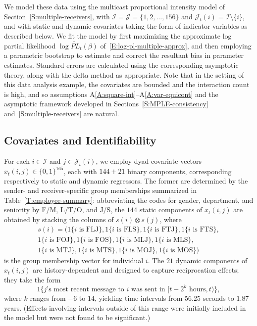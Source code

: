 \documentclass[final]{statsoc}
\begin{document}
We model these data using the multicast proportional intensity
model of Section~\ref{S:multiple-receivers}, with
$\mathcal{I} = \mathcal{J} = \{ 1, 2, \ldots, 156 \}$ and
$\mathcal{J}_t(i) = \mathcal{I} \setminus \{ i \}$, and with static and
dynamic covariates taking the form of indicator variables as described
below.  We fit the model by first maximizing the approximate log partial
likelihood $\log \widetilde{\mathit{PL}}_t(\beta)$ of~\eqref{E:log-pl-multiple-approx}, and then employing a
parametric bootstrap to estimate and correct the resultant bias in
parameter estimates.  Standard errors are calculated using the
corresponding asymptotic theory, along with the delta method as
appropriate.  Note that in the setting of this data analysis example,
the covariates are bounded and the interaction count is high, and so
assumptions A\ref{A:square-int}--A\ref{A:var-equicont} and the asymptotic
framework developed in Sections~\ref{S:MPLE-consistency}
and~\ref{S:multiple-receivers} are natural.

\subsection{Covariates and Identifiability}

For each $i \in \mathcal{I}$ and $j \in \mathcal{J}_t(i)$, we employ dyad
covariate vectors $x_t(i,j) \in \{0,1\}^{165}$, each with $144 + 21$ binary
components, corresponding respectively to static and dynamic regressors.
The former are determined by the sender- and receiver-specific group
memberships summarized in Table~\ref{T:employee-summary}: abbreviating the
codes for gender, department, and seniority by F/M, L/T/O, and J/S, the
$144$ static components of $x_t(i,j)$ are obtained by stacking the columns
of $s(i) \otimes s(j)$, where
\begin{multline*}
    s(i)
    = \big(
        \text{1\{$i$ is FLJ\}},
        \text{1\{$i$ is FLS\}},
        \text{1\{$i$ is FTJ\}},
        \text{1\{$i$ is FTS\}}, \\
        \text{1\{$i$ is FOJ\}},
        \text{1\{$i$ is FOS\}},
        \text{1\{$i$ is MLJ\}},
        \text{1\{$i$ is MLS\}}, \\
        \text{1\{$i$ is MTJ\}},
        \text{1\{$i$ is MTS\}},
        \text{1\{$i$ is MOJ\}},
        \text{1\{$i$ is MOS\}}
    \big)
\end{multline*}
is the group membership vector for individual $i$.  The $21$ dynamic
components of $x_t(i,j)$ are history-dependent and designed to capture
reciprocation effects; they take the form
\[
    1\{\text{$j$'s most recent message to $i$ was sent in
             $[t-2^k \text{ hours}, t)$\}},
\]
where $k$ ranges from $-6$ to $14$, yielding time intervals from
$56.25$ seconds to $1.87$ years.  (Effects involving intervals outside
of this range were initially included in the model but were not found
to be significant.)
\end{document}

